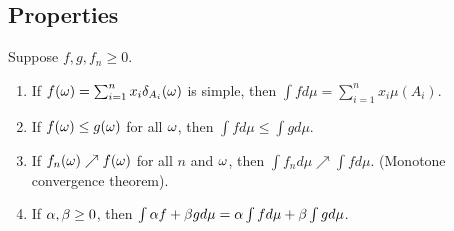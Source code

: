 \subsection{Properties}
\begin{prop}
    Suppose $f,g,f_n \ge 0$.
    \begin{enumerate}
        \item If $f({\omega}) = \sum_{i=1}^n x_i \delta_{A_i}({\omega})$ is simple, then $\int f d\mu = \sum_{i=1}^n x_i \mu(A_i)$.
        \item If $f({\omega}) \le g({\omega})$ for all ${\omega}$, then $\int fd\mu \le \int g d\mu$.
        \item If $f_n({\omega}) \nearrow f({\omega})$ for all $n$ and ${\omega}$, then $\int f_n d\mu \nearrow \int f d\mu$. (Monotone convergence theorem).
        \item If ${\alpha},\beta \ge 0$, then $\int {\alpha} f + \beta g d\mu = {\alpha} \int f d\mu + \beta \int g d\mu$.
    \end{enumerate}
\end{prop}

